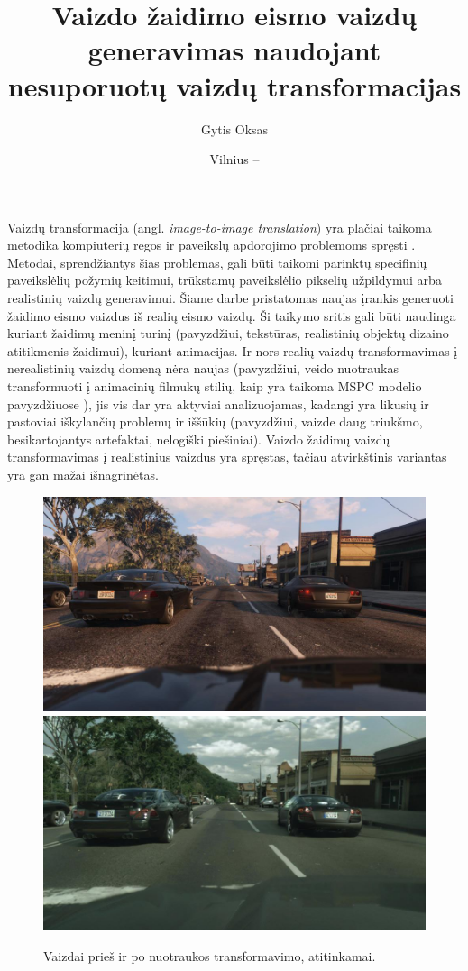 \documentclass{VUMIFPSkursinis}
\institute{Informatikos institutas}
\title{Vaizdo žaidimo eismo vaizdų generavimas naudojant nesuporuotų vaizdų transformacijas}
\author{Gytis Oksas}
\date{Vilnius – \the\year}
\begin{document}
\maketitle

\tableofcontents

    Vaizdų transformacija (angl. \emph{image-to-image  translation}) yra plačiai taikoma metodika kompiuterių regos ir paveikslų apdorojimo problemoms spręsti \cite{ImTImTr}. Metodai, sprendžiantys šias problemas, gali būti taikomi parinktų specifinių paveikslėlių požymių keitimui, trūkstamų paveikslėlio pikselių užpildymui arba realistinių vaizdų generavimui. Šiame darbe pristatomas naujas įrankis generuoti žaidimo eismo vaizdus iš realių eismo vaizdų. Ši taikymo sritis gali būti naudinga kuriant žaidimų meninį turinį (pavyzdžiui, tekstūras, realistinių objektų dizaino atitikmenis žaidimui), kuriant animacijas. Ir nors realių vaizdų transformavimas į nerealistinių vaizdų domeną nėra naujas (pavyzdžiui, veido nuotraukas transformuoti į animacinių filmukų stilių, kaip yra taikoma MSPC modelio pavyzdžiuose \cite{Mspc}), jis vis dar yra aktyviai analizuojamas, kadangi yra likusių ir pastoviai iškylančių problemų ir iššūkių (pavyzdžiui, vaizde daug triukšmo, besikartojantys artefaktai, nelogiški piešiniai). Vaizdo žaidimų vaizdų transformavimas į realistinius vaizdus yra spręstas, tačiau atvirkštinis variantas yra gan mažai išnagrinėtas.

    \begin{figure}[H]
        \centering
        \includegraphics[scale=0.3]{img/EnPhEn_before}
        \includegraphics[scale=0.3]{img/EnPhEn_after}
        \caption{Vaizdai prieš ir po nuotraukos transformavimo, atitinkamai.\cite{EnPhEn}}
        \label{img:mlp}
    \end{figure}
    
\end{document}
